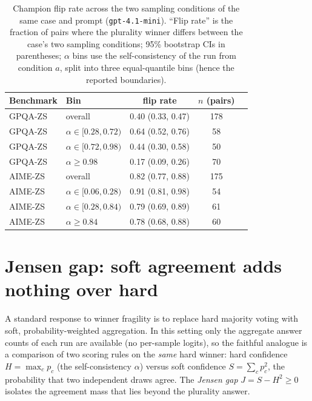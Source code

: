 \documentclass[a4paper,fleqn]{cas-sc}
\begin{document}
\begin{table}[t]
\centering
\caption{Champion flip rate across the two sampling conditions of the
same case and prompt (\texttt{gpt-4.1-mini}). ``Flip rate'' is the fraction of
pairs where the plurality winner differs between the case's two sampling
conditions; 95\% bootstrap CIs in parentheses; $\alpha$ bins use the
self-consistency of the run from condition $a$, split into three
equal-quantile bins (hence the reported boundaries).}
\label{tab:fragility}
\begin{tabular}{llccc}
\toprule
Benchmark & Bin & flip rate & $n$ (pairs) \\
\midrule
GPQA-ZS & overall & 0.40 (0.33, 0.47) & 178 \\
GPQA-ZS & $\alpha\in[0.28,0.72)$ & 0.64 (0.52, 0.76) & 58 \\
GPQA-ZS & $\alpha\in[0.72,0.98)$ & 0.44 (0.30, 0.58) & 50 \\
GPQA-ZS & $\alpha\geq0.98$ & 0.17 (0.09, 0.26) & 70 \\
\midrule
AIME-ZS & overall & 0.82 (0.77, 0.88) & 175 \\
AIME-ZS & $\alpha\in[0.06,0.28)$ & 0.91 (0.81, 0.98) & 54 \\
AIME-ZS & $\alpha\in[0.28,0.84)$ & 0.79 (0.69, 0.89) & 61 \\
AIME-ZS & $\alpha\geq0.84$ & 0.78 (0.68, 0.88) & 60 \\
\bottomrule
\end{tabular}
\end{table}

\section{Jensen gap: soft agreement adds nothing over hard}
\label{app:jensen}

A standard response to winner fragility is to replace hard majority
voting with soft, probability-weighted aggregation. In this setting only
the aggregate answer counts of each run are available (no per-sample
logits), so the faithful analogue is a comparison of two scoring rules on
the \emph{same} hard winner: hard confidence $H=\max_c p_c$ (the self-consistency $\alpha$) versus soft confidence $S=\sum_c p_c^2$, the
probability that two independent draws agree. The \emph{Jensen gap}
$J = S - H^2 \ge 0$ isolates the agreement mass that lies beyond the
plurality answer.
\end{document}
